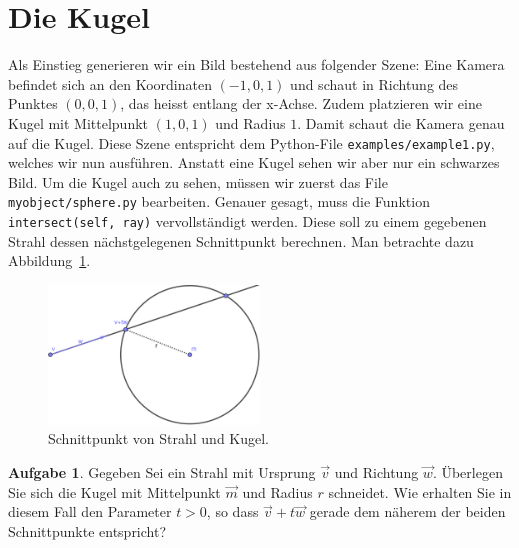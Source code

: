 \documentclass[12pt,a4paper]{article}
\theoremstyle{definition}
\newtheorem{aufgabe}{Aufgabe}
\theoremstyle{definition}
\begin{document}
	\section*{Die Kugel}
	Als Einstieg generieren wir ein Bild bestehend aus folgender Szene:
	Eine Kamera befindet sich an den Koordinaten $(-1,0,1)$ und schaut in Richtung des Punktes $(0,0,1)$, das heisst entlang der x-Achse.
	Zudem platzieren wir eine Kugel mit Mittelpunkt $(1,0,1)$ und Radius $1$.
	Damit schaut die Kamera genau auf die Kugel.
	Diese Szene entspricht dem Python-File \texttt{examples/example1.py}, welches wir nun ausführen. Anstatt eine Kugel sehen wir aber nur ein schwarzes Bild.
	Um die Kugel auch zu sehen, müssen wir zuerst das File \texttt{myobject/sphere.py} bearbeiten.
	Genauer gesagt, muss die Funktion \texttt{intersect(self, ray)} vervollständigt werden.
	Diese soll zu einem gegebenen Strahl dessen nächstgelegenen Schnittpunkt berechnen.
	Man betrachte dazu Abbildung~\ref{fig:sphere_intersect}.
	\begin{figure}[ht]
		\centering
		\includegraphics[width=0.5\textwidth]{images/sphere_intersect.pdf}
		\caption{Schnittpunkt von Strahl und Kugel.}
		\label{fig:sphere_intersect}
	\end{figure}
	\begin{aufgabe}\label{aufg:intersect_theory}
		Gegeben Sei ein Strahl mit Ursprung $\vec{v}$ und Richtung $\vec{w}$.
		Überlegen Sie sich die Kugel mit Mittelpunkt $\vec{m}$ und Radius $r$ schneidet.
		Wie erhalten Sie in diesem Fall den Parameter $t>0$, so dass $\vec{v}+t\vec{w}$ gerade dem näherem der beiden Schnittpunkte entspricht?
	\end{aufgabe}
\end{document}
